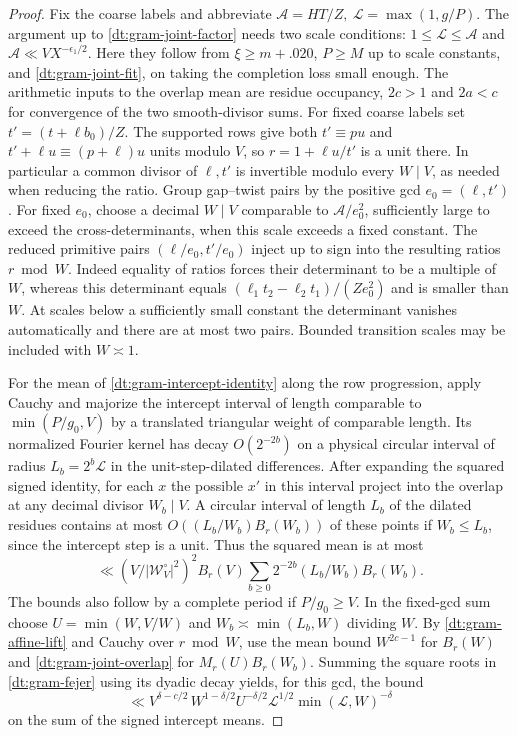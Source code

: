 \documentclass[11pt,a4paper]{article}
\theoremstyle{paperplain}
\numberwithin{equation}{section}
\begin{document}
\begin{proof}
Fix the coarse labels and abbreviate
\(\mathcal A=HT/Z,\ \mathcal L=\max(1,g/P)\).
The argument up to \eqref{dt:gram-joint-factor} needs two scale
conditions: $1\le\mathcal L\le\mathcal A$ and
$\mathcal A\ll VX^{-\epsilon_1/2}$. Here they follow from
$\xi\ge m+.020$, $P\ge M$ up to scale constants, and
\eqref{dt:gram-joint-fit}, on taking the completion loss small enough.
The arithmetic inputs to the overlap mean are residue occupancy,
$2c>1$ and $2a<c$ for convergence of the two smooth-divisor sums.
For fixed coarse labels set $t'=(t+\ell b_0)/Z$. The supported rows
give both $t'\equiv pu$ and $t'+\ell u\equiv(p+\ell)u$ units modulo
$V$, so $r=1+\ell u/t'$ is a unit there. In particular a common
divisor of $\ell,t'$ is invertible modulo every $W\mid V$, as needed
when reducing the ratio.
Group gap--twist pairs by the positive gcd \(e_0=(\ell,t')\).
For fixed \(e_0\), choose a decimal \(W\mid V\) comparable
to \(\mathcal A/e_0^2\), sufficiently large to exceed the
cross-determinants, when this scale exceeds a fixed constant.
The reduced primitive pairs \((\ell/e_0,t'/e_0)\) inject
up to sign into the resulting ratios \(r\bmod W\).
Indeed equality of ratios forces their determinant to be
a multiple of \(W\), whereas this determinant equals
\((\ell_1t_2-\ell_2t_1)/(Ze_0^2)\) and is smaller than \(W\).
At scales below a sufficiently small constant the determinant
vanishes automatically and there are at most two pairs.
Bounded transition scales may be included with \(W\asymp1\).

For the mean of \eqref{dt:gram-intercept-identity} along the
row progression, apply Cauchy and majorize the intercept
interval of length comparable to \(\min(P/g_0,V)\) by a
translated triangular weight of comparable length. Its
normalized Fourier kernel has decay \(O(2^{-2b})\) on a
physical circular interval of radius
\(L_b=2^b\mathcal L\) in the unit-step-dilated differences.
After expanding the squared signed identity, for each \(x\)
the possible \(x'\) in this interval project into the
overlap at any decimal divisor \(W_b\mid V\). A circular
interval of length \(L_b\) of the dilated residues contains
at most \(O((L_b/W_b)B_r(W_b))\) of these points if \(W_b\le L_b\),
since the intercept step is a unit. Thus the squared mean
is at most
\begin{equation}
 \ll (V/|\mathcal W_V^\circ|^2)^2 B_r(V)
        \sum_{b\ge0}2^{-2b}(L_b/W_b)B_r(W_b).
 \label{dt:gram-fejer}
\end{equation}
The bounds also follow by a complete period if \(P/g_0\ge V\).
In the fixed-gcd sum choose
\(U=\min(W,V/W)\) and \(W_b\asymp\min(L_b,W)\) dividing \(W\).
By \eqref{dt:gram-affine-lift} and Cauchy over \(r\bmod W\),
use the mean bound \(W^{2c-1}\) for \(B_r(W)\) and
\eqref{dt:gram-joint-overlap} for \(M_r(U)B_r(W_b)\).
Summing the square roots in \eqref{dt:gram-fejer} using its
dyadic decay yields, for this gcd, the bound
\begin{equation}
 \ll V^{\delta-c/2}\,
           W^{1-\delta/2}U^{-\delta/2}
                 \mathcal L^{1/2}\min(\mathcal L,W)^{-\delta}
 \label{dt:gram-joint-per-gcd}
\end{equation}
on the sum of the signed intercept means.


\end{proof}
\end{document}
